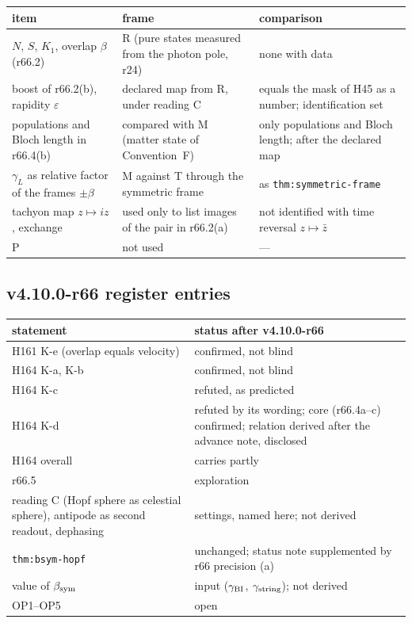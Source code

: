 \begin{center}
\small
\begin{tabular}{@{}>{\raggedright\arraybackslash}p{}>{\raggedright\arraybackslash}p{}>{\raggedright\arraybackslash}p{}@{}}
\toprule
item & frame & comparison\\
\midrule
\(N\), \(S\), \(K_1\), overlap \(\beta\) (r66.2) & R (pure states measured from the photon pole, r24) & none with data\\
boost of r66.2(b), rapidity \(\varepsilon\) & declared map from R, under reading C & equals the mask of H45 as a number; identification set\\
populations and Bloch length in r66.4(b) & compared with M (matter state of Convention~F) & only populations and Bloch length; after the declared map\\
\(\gamma_L\) as relative factor of the frames \(\pm\beta\) & M against T through the symmetric frame & as \texttt{thm:symmetric-frame}\\
tachyon map \(z\mapsto iz\), exchange & used only to list images of the pair in r66.2(a) & not identified with time reversal \(z\mapsto\bar z\)\\
P & not used & ---\\
\bottomrule
\end{tabular}
\end{center}

\subsection*{v4.10.0-r66 register entries}
\label{subsec:v4100-r66-register}

\begin{center}
\small
\begin{tabular}{@{}>{\raggedright\arraybackslash}p{}>{\raggedright\arraybackslash}p{}@{}}
\toprule
statement & status after v4.10.0-r66\\
\midrule
H161 K-e (overlap equals velocity) & confirmed, not blind\\
H164 K-a, K-b & confirmed, not blind\\
H164 K-c & refuted, as predicted\\
H164 K-d & refuted by its wording; core (r66.4a--c) confirmed; relation derived after the advance note, disclosed\\
H164 overall & carries partly\\
r66.5 & exploration\\
reading C (Hopf sphere as celestial sphere), antipode as second readout, dephasing & settings, named here; not derived\\
\texttt{thm:bsym-hopf} & unchanged; status note supplemented by r66 precision (a)\\
value of \(\beta_{\rm sym}\) & input (\(\gamma_{\rm BI}\), \(\gamma_{\rm string}\)); not derived\\
OP1--OP5 & open\\
\bottomrule
\end{tabular}
\end{center}

